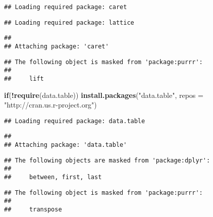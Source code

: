 \documentclass[
]{article}
\newenvironment{Shaded}{\begin{snugshade}}{\end{snugshade}}
\newcommand{\ControlFlowTok}[1]{\textcolor[rgb]{0.13,0.29,0.53}{\textbf{#1}}}
\newcommand{\DataTypeTok}[1]{\textcolor[rgb]{0.13,0.29,0.53}{#1}}
\newcommand{\KeywordTok}[1]{\textcolor[rgb]{0.13,0.29,0.53}{\textbf{#1}}}
\newcommand{\NormalTok}[1]{#1}
\newcommand{\OperatorTok}[1]{\textcolor[rgb]{0.81,0.36,0.00}{\textbf{#1}}}
\newcommand{\StringTok}[1]{\textcolor[rgb]{0.31,0.60,0.02}{#1}}
\begin{document}
\begin{verbatim}
## Loading required package: caret
\end{verbatim}

\begin{verbatim}
## Loading required package: lattice
\end{verbatim}

\begin{verbatim}
## 
## Attaching package: 'caret'
\end{verbatim}

\begin{verbatim}
## The following object is masked from 'package:purrr':
## 
##     lift
\end{verbatim}

\begin{Shaded}
\begin{Highlighting}[]
\ControlFlowTok{if}\NormalTok{(}\OperatorTok{!}\KeywordTok{require}\NormalTok{(data.table)) }\KeywordTok{install.packages}\NormalTok{(}\StringTok{"data.table"}\NormalTok{, }\DataTypeTok{repos =} \StringTok{"http://cran.us.r-project.org"}\NormalTok{)}
\end{Highlighting}
\end{Shaded}

\begin{verbatim}
## Loading required package: data.table
\end{verbatim}

\begin{verbatim}
## 
## Attaching package: 'data.table'
\end{verbatim}

\begin{verbatim}
## The following objects are masked from 'package:dplyr':
## 
##     between, first, last
\end{verbatim}

\begin{verbatim}
## The following object is masked from 'package:purrr':
## 
##     transpose
\end{verbatim}
\end{document}
